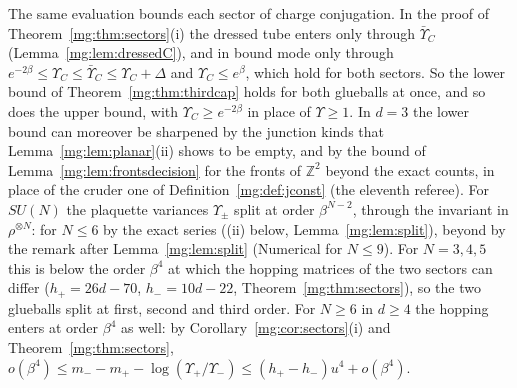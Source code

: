 \documentclass[11pt,a4paper]{article}
\theoremstyle{definition}
\theoremstyle{remark}
\newcommand{\Z}{\mathbb{Z}}
\begin{document}
The same evaluation bounds each sector of charge conjugation. In the proof of Theorem~\ref{mg:thm:sectors}(i) the dressed tube enters only through $\bar\Upsilon_C$
(Lemma~\ref{mg:lem:dressedC}), and in bound mode only through $e^{-2\beta}\le\Upsilon_C\le\bar\Upsilon_C\le\Upsilon_C+\Delta$ and $\Upsilon_C\le e^\beta$, which hold for both sectors. So the lower
bound of Theorem~\ref{mg:thm:thirdcap} holds for both glueballs at once, and so does the upper bound, with $\Upsilon_C\ge e^{-2\beta}$ in place of $\Upsilon\ge1$. In $d=3$ the lower bound can
moreover be sharpened by the junction kinds that Lemma~\ref{mg:lem:planar}(ii) shows to be empty, and by the bound of Lemma~\ref{mg:lem:frontsdecision} for the fronts of $\Z^2$
beyond the exact counts, in place of the cruder one of Definition~\ref{mg:def:jconst} (the eleventh referee). For $SU(N)$ the plaquette variances $\Upsilon_\pm$ split at order $\beta^{N-2}$, through the
invariant in $\rho^{\otimes N}$: for $N\le6$ by the exact series ((ii) below, Lemma~\ref{mg:lem:split}), beyond by the remark after Lemma~\ref{mg:lem:split} (Numerical for $N\le9$). For $N=3,4,5$ this is below the order $\beta^4$ at which the hopping matrices of the two
sectors can differ ($h_+=26d-70$, $h_-=10d-22$, Theorem~\ref{mg:thm:sectors}), so the two glueballs split at first, second and third order. For $N\ge6$ in $d\ge4$ the hopping enters at order
$\beta^4$ as well: by Corollary~\ref{mg:cor:sectors}(i) and Theorem~\ref{mg:thm:sectors}, $o(\beta^4)\le m_--m_+-\log(\Upsilon_+/\Upsilon_-)\le(h_+-h_-)u^4+o(\beta^4)$.
\end{document}
